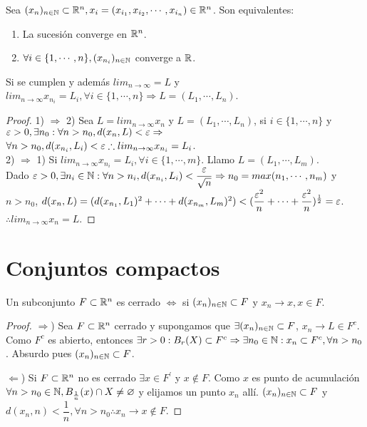 \begin{prop}
  Sea $(x_n)_{n \in \mathbb{N}} \subset \mathbb{R}^n, x_i = (x_{i_1}, x_{i_2}, \cdots, x_{i_n}) \in \mathbb{R}^n$. Son equivalentes:
  \begin{enumerate}
    \item La sucesión converge en $\mathbb{R}^n$.
    \item $\forall i \in \{1, \cdots, n\}, (x_{n_i})_{n \in \mathbb{N}}$ converge a $\mathbb{R}$.
  \end{enumerate}
  Si se cumplen y además $lim_{n \to \infty} = L$ y $lim_{n \to \infty} x_{n_i} = L_i, \forall i \in \{1, \cdots, n\} \Rightarrow L = (L_1, \cdots, L_n)$.
  \begin{proof}
    1) $\Rightarrow$ 2) Sea $L = lim_{n \to \infty} x_n$ y $L = (L_1, \cdots, L_n)$, si $i \in \{1, \cdots, n\}$ y $\varepsilon > 0, \exists n_0 : \forall n > n_0, d(x_n, L) < \varepsilon \Rightarrow$ \\
    $\forall n > n_0, d(x_{n_i}, L_i) < \varepsilon \therefore lim_{n \to \infty} x_{n_i} = L_i$. \\
    2) $\Rightarrow$ 1) Si $lim_{n \to \infty} x_{n_i} = L_i, \forall i \in \{1, \cdots, m\}$. Llamo $L = (L_1, \cdots, L_m)$. \\
    Dado $\varepsilon > 0, \exists n_i \in \mathbb{N} : \forall n > n_i, d(x_{n_i}, L_i) < \dfrac{\varepsilon}{\sqrt{n}} \Rightarrow n_0 = max(n_1, \cdots, n_m)$ y $n > n_0$, $d(x_n, L) = (d(x_{n_1}, L_1)^2 + \cdots + d(x_{n_m}, L_m)^2) < (\dfrac{\varepsilon^2}{n} + \cdots + \dfrac{\varepsilon^2}{n})^{\frac{1}{2}} = \varepsilon$. \\
    $\therefore lim_{n \to \infty} x_n = L$.
  \end{proof}
\end{prop}

\section{Conjuntos compactos}

\begin{theorem}
  Un subconjunto $F \subset \mathbb{R}^n$ es cerrado $\iff$ si $(x_n)_{n \in \mathbb{N}} \subset F$ y $x_n \to x, x \in F$.
  \begin{proof}
    $\Rightarrow$) Sea $F \subset \mathbb{R}^n$ cerrado y supongamos que $\exists (x_n)_{n \in \mathbb{N}} \subset F$, $x_n \to L \in F^c$. Como $F^c$ es abierto, entonces $\exists r > 0 : B_r(X) \subset F^c \Rightarrow \exists n_0 \in \mathbb{N} : x_n \subset F^c, \forall n > n_0$. Absurdo pues $(x_n)_{n \in \mathbb{N}} \subset F$.

    $\Leftarrow$) Si $F \subset \mathbb{R}^n$ no es cerrado $\exists x \in F^{\prime}$ y $x \notin F$. Como $x$ es punto de acumulación $\forall n > n_0 \in \mathbb{N}, B_{\frac{1}{n}}(x) \cap X \neq \varnothing$ y elijamos un punto $x_n$ allí. $(x_n)_{n \in \mathbb{N}} \subset F$ y $d(x_n, n) < \dfrac{1}{n}, \forall n > n_0 \therefore x_n \to x \notin F$.
  \end{proof}
\end{theorem}

